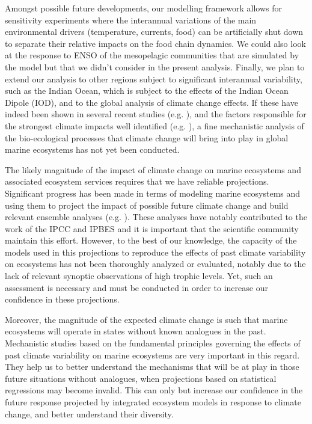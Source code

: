 Amongst possible future developments, our modelling framework allows for sensitivity experiments where the interannual variations of the main environmental drivers (temperature, currents, food) can be artificially shut down to separate their relative impacts on the food chain dynamics. We could also look at the response to ENSO of the mesopelagic communities that are simulated by the model but that we didn't consider in the present analysis. Finally, we plan to extend our analysis to other regions subject to significant interannual variability, such as the Indian Ocean, which is subject to the effects of the Indian Ocean Dipole (IOD), and to the global analysis of climate change effects. If these have indeed been shown in several recent studies (e.g. \citealp{lotzeGlobalEnsembleProjections2019, tittensorNextgenerationEnsembleProjections2021}), and the factors responsible for the strongest climate impacts well identified (e.g. \citealp{heneghanDisentanglingDiverseResponses2021}), a fine mechanistic analysis of the bio-ecological processes that climate change will bring into play in global marine ecosystems has not yet been conducted.

The likely magnitude of the impact of climate change on marine ecosystems and associated ecosystem services requires that we have reliable projections. Significant progress has been made in terms of modeling marine ecosystems and using them to project the impact of possible future climate change and build relevant ensemble analyses (e.g. \citealp{lotzeGlobalEnsembleProjections2019, tittensorNextgenerationEnsembleProjections2021}). These analyses have notably contributed to the work of the IPCC \citep{portnerIPCCSpecialReport2019, portnerClimateChange20222022} and IPBES \citep{brondizioGlobalAssessmentReport2019} and it is important that the scientific community maintain this effort. However, to the best of our knowledge, the capacity of the models used in this projections to reproduce the effects of past climate variability on ecosystems has not been thoroughly analyzed or evaluated, notably due to the lack of relevant synoptic observations of high trophic levels. Yet, such an assessment is necessary and must be conducted in order to increase our confidence in these projections.

Moreover, the magnitude of the expected climate change is such that marine ecosystems will operate in states without known analogues in the past. Mechanistic studies based on the fundamental principles governing the effects of past climate variability on marine ecosystems are very important in this regard. They help us to better understand the mechanisms that will be at play in those future situations without analogues, when projections based on statistical regressions may become invalid. This can only but increase our confidence in the future response projected by integrated ecosystem models in response to climate change, and better understand their diversity.